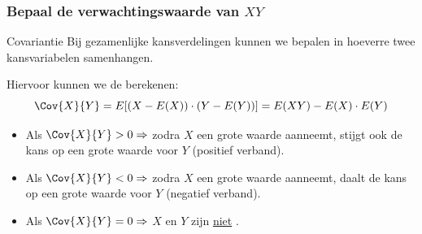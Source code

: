     \begin{frame}\frametitle{Bepaal de verwachtingswaarde van $XY$}
        
    \end{frame}

    \begin{frame}{Covariantie}
        Bij gezamenlijke kansverdelingen kunnen we bepalen in hoeverre twee kansvariabelen samenhangen.

        Hiervoor kunnen we de  berekenen:
        \[
            \Cov{X}{Y} = E[(X - E(X)) \cdot (Y - E(Y))] = E(XY) - E(X)\cdot E(Y)
        \]
        \begin{itemize}[<+->]\setlength\itemsep{2em}
            \item Als $\Cov{X}{Y} > 0 \Rightarrow$ zodra $X$ een grote waarde aanneemt, stijgt ook de kans op een grote waarde voor $Y$ (positief verband).
            \item Als $\Cov{X}{Y} < 0 \Rightarrow$ zodra $X$ een grote waarde aanneemt, daalt de kans op een grote waarde voor $Y$ (negatief verband).
            \item Als $\Cov{X}{Y} = 0 \Rightarrow$ $X$ en $Y$ zijn \underline{niet} .
        \end{itemize}
    \end{frame}

